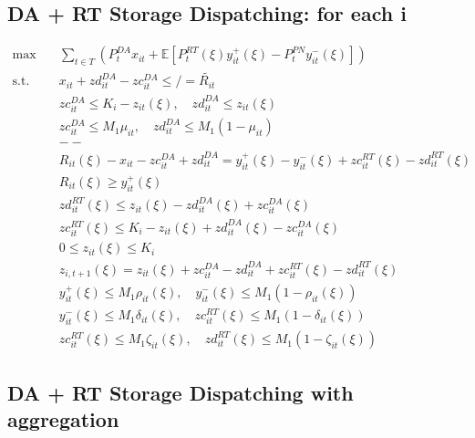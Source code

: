 \documentclass[10pt]{article}
\begin{document}
\subsection{DA + RT Storage Dispatching: for each i}

\begin{subequations}
    \begin{align}
    \text{max} \quad &\sum_{t\in T}\left(P_t^{DA}x_{it} + \mathbb{E}\left[P_t^{RT}(\xi)y_{it}^{+}(\xi) - P_t^{PN}y_{it}^{-}(\xi)\right]\right)&\\    
    \text{s.t.} \quad &x_{it} + zd^{DA}_{it} - zc^{DA}_{it} \leq / = \widetilde{R_{it}}&\\
    &zc^{DA}_{it} \leq K_i - z_{it}(\xi), \quad zd^{DA}_{it} \leq z_{it}(\xi)&\\
    &zc^{DA}_{it} \leq M_1 \mu_{it}, \quad zd^{DA}_{it} \leq M_1 (1 - \mu_{it}) &\\
    &--&\\
    &R_{it}(\xi) - x_{it} - zc^{DA}_{it} + zd^{DA}_{it} = y_{it}^{+}(\xi) - y_{it}^{-}(\xi) + zc^{RT}_{it}(\xi) - zd^{RT}_{it}(\xi)&\\ 
    &R_{it}(\xi) \geq y^+_{it}(\xi) &\\
    &zd^{RT}_{it}(\xi) \leq z_{it}(\xi) - zd^{DA}_{it}(\xi) + zc^{DA}_{it}(\xi)&\\
    &zc^{RT}_{it}(\xi) \leq K_i - z_{it}(\xi) + zd^{DA}_{it}(\xi) - zc^{DA}_{it}(\xi)&\\
    &0 \leq z_{it}(\xi) \leq K_i&\\
    &z_{i,t+1}(\xi) = z_{it}(\xi) + zc^{DA}_{it} - zd^{DA}_{it} + zc^{RT}_{it}(\xi) - zd^{RT}_{it}(\xi) &\\
    &y^+_{it}(\xi) \leq M_1 \rho_{it}(\xi), \quad y^-_{it}(\xi) \leq M_1 (1 - \rho_{it}(\xi))  &\\
    &y^-_{it}(\xi) \leq M_1 \delta_{it}(\xi), \quad zc^{RT}_{it}(\xi) \leq M_1 (1 - \delta_{it}(\xi))&\\
    &zc^{RT}_{it}(\xi) \leq M_1 \zeta_{it}(\xi), \quad zd^{RT}_{it}(\xi) \leq M_1 (1 - \zeta_{it}(\xi)) &
    \end{align}
\end{subequations}

\subsection{DA + RT Storage Dispatching with aggregation}
\end{document}
